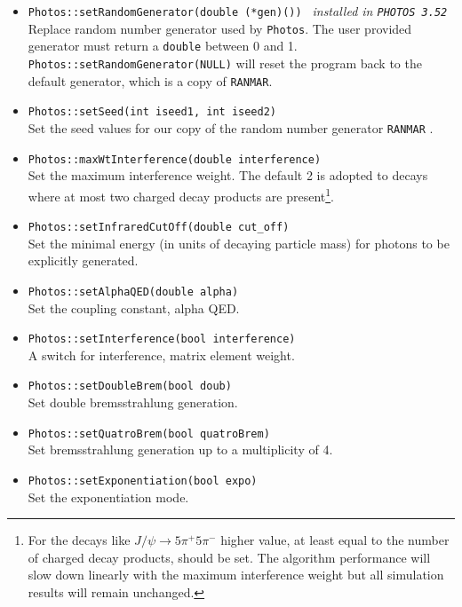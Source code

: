 \documentclass[]{Photos_interface_design}
\begin{document}
\begin{itemize}
  \item {\tt Photos::setRandomGenerator(double (*gen)()) } {\it  installed in {\tt PHOTOS 3.52}}\\
        Replace random number generator used by {\tt Photos}.
        The user provided generator   must return a {\tt double} between 0 and 1. 
        {\tt Photos::setRandomGenerator(NULL)} will reset the program back to  
        the default generator, which is a copy of {\tt RANMAR}\cite{James:1988vf,marsaglia:1987}.
  \item {\tt Photos::setSeed(int iseed1, int iseed2)} \\
        Set the  seed values for our copy of the random number generator {\tt RANMAR} \cite{James:1988vf,marsaglia:1987}.
  \item {\tt Photos::maxWtInterference(double interference)} \\
        Set the maximum interference weight. The default 2 is adopted to decays where at most two charged decay products
        are present\footnote{For 
        the decays like $J/\psi \to 5\pi^+ 5\pi^-$ higher value, at least equal to the number of charged decay 
        products, should be set. The algorithm performance will slow down linearly with the  maximum interference weight but all 
        simulation results will remain unchanged.   
        }.
  \item {\tt Photos::setInfraredCutOff(double cut\_off)} \\
        Set the minimal energy (in units of decaying particle mass)
        for photons to be explicitly generated.
  \item {\tt Photos::setAlphaQED(double alpha)} \\
        Set the coupling constant, alpha QED.
  \item {\tt Photos::setInterference(bool interference)} \\
        A switch for interference, matrix element weight.
  \item {\tt Photos::setDoubleBrem(bool doub)} \\
        Set double bremsstrahlung generation.
  \item {\tt Photos::setQuatroBrem(bool quatroBrem)} \\
        Set bremsstrahlung generation up to a multiplicity of 4.
  \item {\tt Photos::setExponentiation(bool expo)} \\
        Set the exponentiation mode.

\end{itemize}
\end{document}
